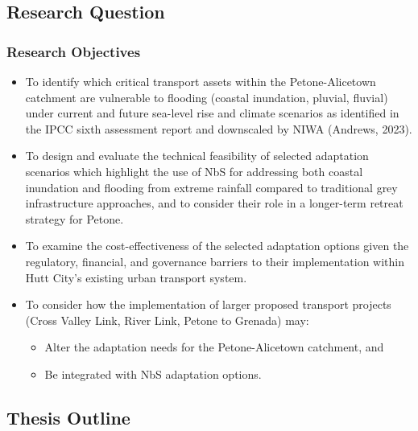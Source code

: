\subsection{Research Question}
\subsubsection{Research Objectives}
\begin{itemize}
    \item To identify which critical transport assets within the Petone-Alicetown catchment are vulnerable to flooding (coastal inundation, pluvial, fluvial) under current and future sea-level rise and climate scenarios as identified in the IPCC sixth assessment report and downscaled by NIWA (Andrews, 2023).
    \item To design and evaluate the technical feasibility of selected adaptation scenarios which highlight the use of NbS for addressing both coastal inundation and flooding from extreme rainfall compared to traditional grey infrastructure approaches, and to consider their role in a longer-term retreat strategy for Petone.
    \item To examine the cost-effectiveness of the selected adaptation options given the regulatory, financial, and governance barriers to their implementation within Hutt City’s existing urban transport system.
    \item To consider how the implementation of larger proposed transport projects (Cross Valley Link, River Link, Petone to Grenada) may: 
\begin{itemize}
    \item Alter the adaptation needs for the Petone-Alicetown catchment, and
    \item Be integrated with NbS adaptation options.
\end{itemize}
\end{itemize}




\subsection{Thesis Outline}


